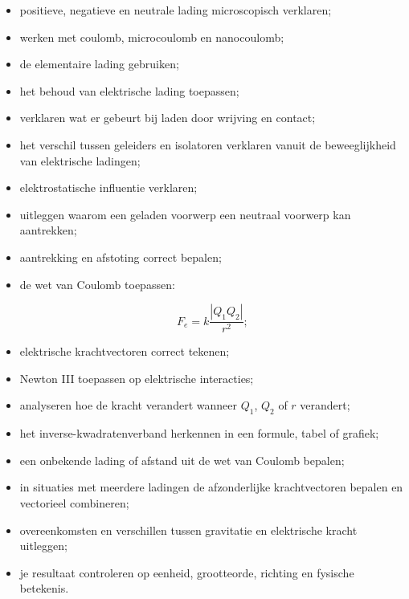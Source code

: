\documentclass{ximera}
\begin{document}
\begin{itemize}

  \item positieve, negatieve en neutrale lading microscopisch
        verklaren;

  \item werken met coulomb, microcoulomb en nanocoulomb;

  \item de elementaire lading gebruiken;

  \item het behoud van elektrische lading toepassen;

  \item verklaren wat er gebeurt bij laden door wrijving en contact;

  \item het verschil tussen geleiders en isolatoren verklaren vanuit
        de beweeglijkheid van elektrische ladingen;

  \item elektrostatische influentie verklaren;

  \item uitleggen waarom een geladen voorwerp een neutraal voorwerp kan
        aantrekken;

  \item aantrekking en afstoting correct bepalen;

  \item de wet van Coulomb toepassen:

        \[
        F_e=k\frac{|Q_1Q_2|}{r^2};
        \]

  \item elektrische krachtvectoren correct tekenen;

  \item Newton III toepassen op elektrische interacties;

  \item analyseren hoe de kracht verandert wanneer $Q_1$, $Q_2$ of
        $r$ verandert;

  \item het inverse-kwadratenverband herkennen in een formule, tabel of
        grafiek;

  \item een onbekende lading of afstand uit de wet van Coulomb bepalen;

  \item in situaties met meerdere ladingen de afzonderlijke
        krachtvectoren bepalen en vectorieel combineren;

  \item overeenkomsten en verschillen tussen gravitatie en elektrische
        kracht uitleggen;

  \item je resultaat controleren op eenheid, grootteorde, richting en
        fysische betekenis.

\end{itemize}
\end{document}
